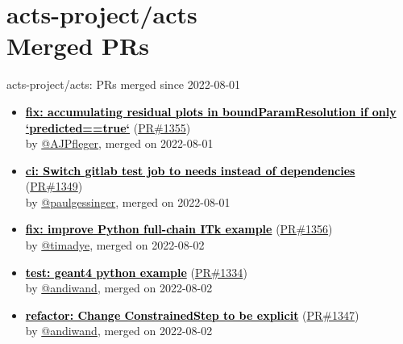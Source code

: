 \documentclass{beamer}
\begin{document}
  








\section{ acts-project/acts \\ Merged PRs}
\begin{frame}[allowframebreaks]{ acts-project/acts: PRs merged since 2022-08-01 }

  \begin{itemize}
    
    \item
    \textbf{\href{https://github.com/acts-project/acts/pull/1355}{\textcolor{black}{fix: accumulating residual plots in boundParamResolution if only `predicted==true`}}}
    (\href{https://github.com/acts-project/acts/pull/1355}{PR\#1355}) \\
    by \href{https://github.com/AJPfleger}{ @AJPfleger}, merged on 2022-08-01

    \item
    \textbf{\href{https://github.com/acts-project/acts/pull/1349}{\textcolor{black}{ci: Switch gitlab test job to needs instead of dependencies}}}
    (\href{https://github.com/acts-project/acts/pull/1349}{PR\#1349}) \\
    by \href{https://github.com/paulgessinger}{ @paulgessinger}, merged on 2022-08-01

    \item
    \textbf{\href{https://github.com/acts-project/acts/pull/1356}{\textcolor{black}{fix: improve Python full-chain ITk example}}}
    (\href{https://github.com/acts-project/acts/pull/1356}{PR\#1356}) \\
    by \href{https://github.com/timadye}{ @timadye}, merged on 2022-08-02

    \item
    \textbf{\href{https://github.com/acts-project/acts/pull/1334}{\textcolor{black}{test: geant4 python example}}}
    (\href{https://github.com/acts-project/acts/pull/1334}{PR\#1334}) \\
    by \href{https://github.com/andiwand}{ @andiwand}, merged on 2022-08-02

    \item
    \textbf{\href{https://github.com/acts-project/acts/pull/1347}{\textcolor{black}{refactor: Change ConstrainedStep to be explicit}}}
    (\href{https://github.com/acts-project/acts/pull/1347}{PR\#1347}) \\
    by \href{https://github.com/andiwand}{ @andiwand}, merged on 2022-08-02


\end{itemize}
\end{frame}
\end{document}
